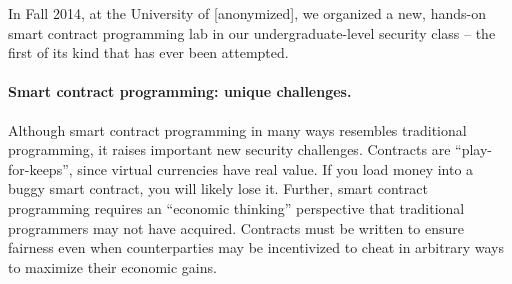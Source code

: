 \documentclass{llncs}
\newcommand{\ignore}[1]{}
\begin{document}
In Fall 2014, at the University of [anonymized], 
we organized a new, hands-on
smart contract programming lab in 
our undergraduate-level security
class -- the first of its
kind that has ever been attempted.




\ignore{
The first part of this lab consists of step-by-step examples illustrating basic design of functional smart contracts. We highly recommend you take a hands-on approach, and interact with these smart contract examples using the Ethereum simulator! The accompanying materials to everything you need to get started with experimenting, including  a virtual machine image, basic instructions, and a language guide.

The second part of this lab focuses on designing smart contracts that achieve their intended goals, and are robust to attacks. 
Although our lab makes us of a simulator, the smart contracts you write can also be used in the live Ethereum network\footnote{At the time of this writing, the only live Ethereum network is a test network, since the main network has not yet launched.} The basic concepts we discuss apply to other cryptocurrencies as well (including Bitcoin), so most of what you learn will be transferable.
}

\paragraph{Smart contract programming: unique challenges.}
Although smart contract programming in many ways resembles 
traditional programming, 
it raises important new security challenges. 
Contracts are ``play-for-keeps'', since virtual currencies have real value. 
If you load money into a buggy smart contract, you will likely lose it. 
Further, smart contract programming requires
an ``economic thinking'' perspective that traditional
programmers may not have acquired.
Contracts must be written to ensure fairness even when
counterparties may be incentivized to cheat in arbitrary ways to maximize
their economic gains.
\end{document}

